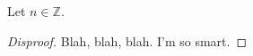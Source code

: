 \documentclass[12pt]{article}
\newcommand{\Z}{\mathbb{Z}}
\newenvironment{proposition}[2][Proposition]{\begin{trivlist}
    \item[\hskip \labelsep {\bfseries #1}\hskip \labelsep {\bfseries #2.}]}{\end{trivlist}}
\begin{document}
	    \begin{proposition}{x.yz}
	    Let $n\in \Z$.  
	    \end{proposition}
	     
	     \begin{proof}[Disproof]%
	     Blah, blah, blah.  I'm so smart.
	     \end{proof}
	      
	       
	       
\end{document}
